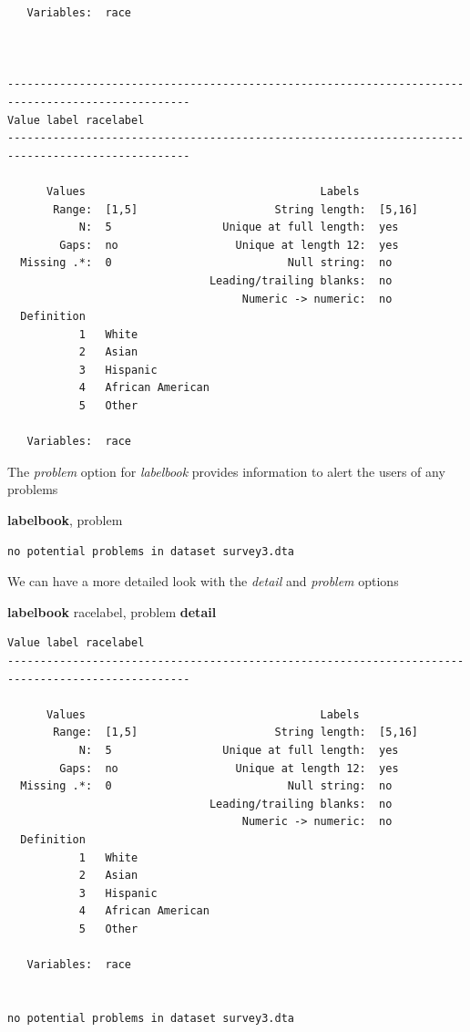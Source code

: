 \documentclass[
]{book}
\newenvironment{Shaded}{\begin{snugshade}}{\end{snugshade}}
\newcommand{\KeywordTok}[1]{\textcolor[rgb]{0.13,0.29,0.53}{\textbf{#1}}}
\newcommand{\NormalTok}[1]{#1}
\begin{document}
\begin{verbatim}
   Variables:  race



--------------------------------------------------------------------------------------------------
Value label racelabel 
--------------------------------------------------------------------------------------------------

      Values                                    Labels
       Range:  [1,5]                     String length:  [5,16]
           N:  5                 Unique at full length:  yes
        Gaps:  no                  Unique at length 12:  yes
  Missing .*:  0                           Null string:  no
                               Leading/trailing blanks:  no
                                    Numeric -> numeric:  no
  Definition
           1   White
           2   Asian
           3   Hispanic
           4   African American
           5   Other

   Variables:  race
\end{verbatim}

The \emph{problem} option for \emph{labelbook} provides information to alert the users of any problems

\begin{Shaded}
\begin{Highlighting}[]
\KeywordTok{labelbook}\NormalTok{, problem}
\end{Highlighting}
\end{Shaded}

\begin{verbatim}
no potential problems in dataset survey3.dta
\end{verbatim}

We can have a more detailed look with the \emph{detail} and \emph{problem} options

\begin{Shaded}
\begin{Highlighting}[]
\KeywordTok{labelbook}\NormalTok{ racelabel, problem }\KeywordTok{detail}
\end{Highlighting}
\end{Shaded}

\begin{verbatim}
Value label racelabel 
--------------------------------------------------------------------------------------------------

      Values                                    Labels
       Range:  [1,5]                     String length:  [5,16]
           N:  5                 Unique at full length:  yes
        Gaps:  no                  Unique at length 12:  yes
  Missing .*:  0                           Null string:  no
                               Leading/trailing blanks:  no
                                    Numeric -> numeric:  no
  Definition
           1   White
           2   Asian
           3   Hispanic
           4   African American
           5   Other

   Variables:  race


no potential problems in dataset survey3.dta
\end{verbatim}
\end{document}
